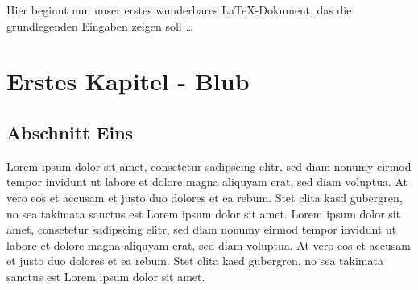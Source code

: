 \documentclass[10pt, a4paper]{scrreprt}
\begin{document}
 Hier beginnt nun unser erstes wunderbares LaTeX-Dokument,
 das die grundlegenden Eingaben zeigen soll \dots
\chapter{Erstes Kapitel - Blub}
\section{Abschnitt Eins}
Lorem ipsum dolor sit amet, consetetur sadipscing elitr, sed diam nonumy eirmod tempor invidunt ut labore et dolore magna aliquyam erat, sed diam voluptua. At vero eos et accusam et justo duo dolores et ea rebum. Stet clita kasd gubergren, no sea takimata sanctus est Lorem ipsum dolor sit amet. Lorem ipsum dolor sit amet, consetetur sadipscing elitr, sed diam nonumy eirmod tempor invidunt ut labore et dolore magna aliquyam erat, sed diam voluptua. At vero eos et accusam et justo duo dolores et ea rebum. Stet clita kasd gubergren, no sea takimata sanctus est Lorem ipsum dolor sit amet.
 
\end{document}
